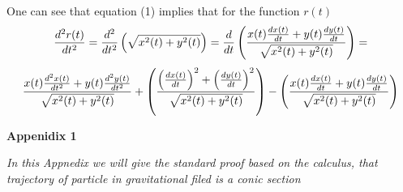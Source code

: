 {  One can see that equation (1) implies that
for the function $r(t)$ 
         $$
{d^2r(t)\over dt^2}=
          {d^2\over dt^2}
      \left(\sqrt{x^2(t)+y^2(t)}\right)
         = {d\over dt}
      \left(
    x(t){dx(t)\over dt}+
    y(t){dy(t)\over dt}
         \over 
\sqrt{x^2(t)+y^2(t)}
      \right)=
         $$
           $$
         {
    x(t){d^2x(t)\over dt^2}+
    y(t){d^2y(t)\over dt^2}
         \over 
\sqrt{x^2(t)+y^2(t)}
            }+
       \left(
    \left({dx(t)\over dt}\right)^2+
    \left({dy(t)\over dt}\right)^2
         \over 
\sqrt{x^2(t)+y^2(t)}
      \right)-
         \left(
    x(t){dx(t)\over dt}+
    y(t){dy(t)\over dt}
         \over 
\sqrt{x^2(t)+y^2(t)}
      \right)
           $$

\bigskip

   \centerline {\bf Appenidix 1}


{\it In this Appnedix we will give
the standard proof based on the calculus, that
 trajectory of particle in gravitational filed is
a conic section}

}
